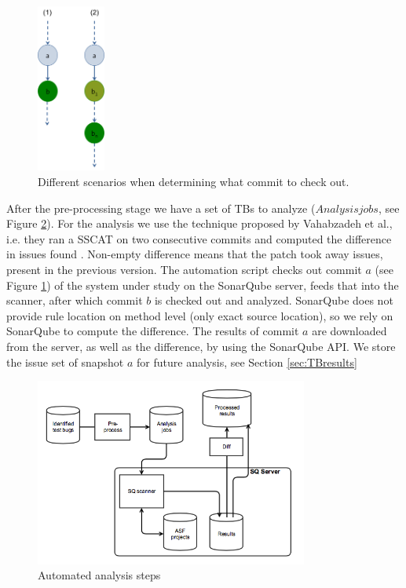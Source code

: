 \documentclass{uvamscse}
\newcommand{\Atestbugs}{Vahabzadeh et al.}
\begin{document}
\begin{figure}[!ht]
	\centering
	\includegraphics[width=0.2\textwidth]{figures/findCommit.png}
	\caption{Different scenarios when determining what commit to check out.}
	\label{fig:findCommit}
\end{figure}

After the pre-processing stage we have a set of TBs to analyze ($Analysis jobs$, see Figure \ref{fig:analysisFlow}). For the analysis we use the technique proposed by \Atestbugs{}, i.e. they ran a SSCAT on two consecutive commits and computed the difference in issues found \cite{vahabzadeh2015empirical}. Non-empty difference means that the patch took away issues, present in the previous version. The automation script checks out commit $a$ (see Figure \ref{fig:findCommit}) of the system under study on the SonarQube server, feeds that into the scanner, after which commit $b$ is checked out and analyzed. SonarQube does not provide rule location on method level (only exact source location), so we rely on SonarQube to compute the difference. The results of commit $a$ are downloaded from the server, as well as the difference, by using the SonarQube API. We store the issue set of snapshot $a$ for future analysis, see Section \ref{sec:TBresults} 

\begin{figure}[!ht]
	
	\centering
	\includegraphics[width=0.8\textwidth]{figures/sqanalysisflowchart.png}
	\caption{Automated analysis steps}
	\label{fig:analysisFlow}
\end{figure}
\end{document}
